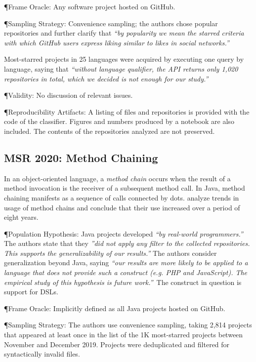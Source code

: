 \documentclass[sigconf,review,anonymous]{acmart}
\newcommand{\gh}{{GitHub}\xspace}
\begin{document}
\P{Frame Oracle:} Any software project hosted on \gh.

\P{Sampling Strategy:} Convenience sampling; the authors chose popular
repositories and further clarify that {\it ``by popularity we mean the starred
  criteria with which \gh users express liking similar to likes in social
  networks.''\,}

Most-starred projects in 25 languages were acquired by executing one query by
language, saying that {\it ``without language qualifier, the API returns only
  1,020 repositories in total, which we decided is not enough for our study.''}

\P{Validity:} No discussion of relevant issues.

\P{Reproducibility Artifacts:} A listing of files and repositories is provided
with the code of the classifier. Figures and numbers produced by a notebook are also
included. The contents of the repositories analyzed are not preserved.

\subsection{MSR 2020: Method Chaining}

In an object-oriented language, a \emph{method chain} occurs when the result of
a method invocation is the receiver of a subsequent method call. In Java, method
chaining manifests as a sequence of calls connected by dots.
\citet{nakamaru:2020:MSR} analyze trends in usage of method chains and conclude
that their use increased over a period of eight years.

\P{Population Hypothesis:} Java projects developed {\it ``by real-world
  programmers.''\,} The authors state that they {\it ''did not apply any filter to
  the collected repositories. This supports the generalizability of our
  results.''}
The authors consider generalization beyond Java, saying {\it ``our
  results are more likely to be applied to a language that does not provide such
  a construct (e.g. PHP and JavaScript). The empirical study of this hypothesis
  is future work.''\,} The construct in question is support for DSLs.

\P{Frame Oracle:} Implicitly defined as all Java projects hosted on \gh.

\P{Sampling Strategy:} The authors use convenience sampling, taking 2,814
projects that appeared at least once in the list of the 1K most-starred projects
between November and December 2019. Projects were deduplicated and filtered for
syntactically invalid files.
\end{document}
